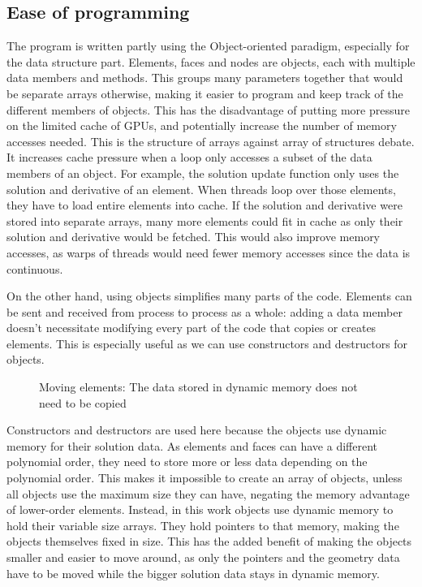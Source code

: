 \subsection{Ease of programming} \label{subsection:graphics_processing_units:data_structure:ease_of_programming}

The program is written partly using the Object-oriented paradigm, especially for the data structure
part. Elements, faces and nodes are objects, each with multiple data members and methods. This
groups many parameters together that would be separate arrays otherwise, making it easier to program
and keep track of the different members of objects. This has the disadvantage of putting more
pressure on the limited cache of GPUs, and potentially increase the number of memory accesses
needed. This is the structure of arrays against array of structures debate. It increases cache
pressure when a loop only accesses a subset of the data members of an object. For example, the
solution update function only uses the solution and derivative of an element. When threads loop over
those elements, they have to load entire elements into cache. If the solution and derivative were
stored into separate arrays, many more elements could fit in cache as only their solution and
derivative would be fetched. This would also improve memory accesses, as warps of threads would need
fewer memory accesses since the data is continuous.

On the other hand, using objects simplifies many parts of the code. Elements can be sent and
received from process to process as a whole: adding a data member doesn't necessitate modifying
every part of the code that copies or creates elements. This is especially useful as we can use
constructors and destructors for objects.

\begin{figure}[H]
	\centering
	
	\caption{Moving elements: The data stored in dynamic memory does not need to be copied}
	\label{fig:moving_elements}
\end{figure}

Constructors and destructors are used here because the objects use dynamic memory for their solution
data. As elements and faces can have a different polynomial order, they need to store more or less
data depending on the polynomial order. This makes it impossible to create an array of objects,
unless all objects use the maximum size they can have, negating the memory advantage of lower-order
elements. Instead, in this work objects use dynamic memory to hold their variable size arrays. They
hold pointers to that memory, making the objects themselves fixed in size. This has the added
benefit of making the objects smaller and easier to move around, as only the pointers and the
geometry data have to be moved while the bigger solution data stays in dynamic memory. 

